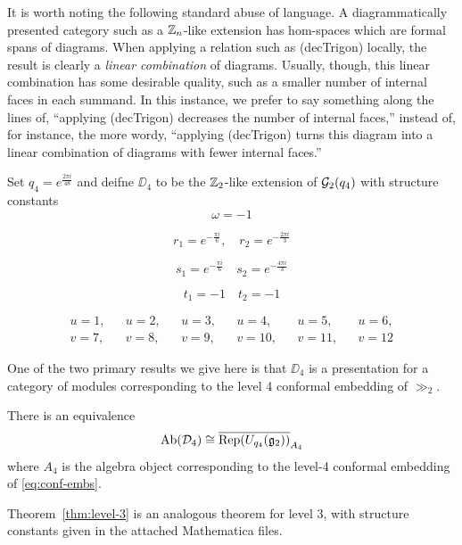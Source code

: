\begin{remark}
    It is worth noting the following standard abuse of language. 
    A diagrammatically presented category such as a $\mathbb{Z}_n$-like extension has hom-spaces which are formal spans of diagrams.
    When applying a relation such as (decTrigon) locally, the result is clearly a {\it linear combination} of diagrams.
    Usually, though, this linear combination has some desirable quality, such as a smaller number of internal faces in each summand.
    In this instance, we prefer to say something along the lines of, 
    ``applying (decTrigon) decreases the number of internal faces,''
    instead of, for instance, the more wordy,
    ``applying (decTrigon) turns this diagram into a linear combination of diagrams with fewer internal faces.''
\end{remark}



\begin{definition}
    Set $q_4 = e^{\frac{2\pi i}{48}}$ and deifne $\DD_4$ to be the $\mathbb{Z}_2$-like extension of $\mathcal{G}_2(q_4)$ with structure constants
    \begin{equation*}
    \omega = -1
    \end{equation*}

    \begin{equation*}
        r_1 = e^{-\frac{\pi i}{6}}, \quad r_2 = e^{-\frac{2\pi i}{3}}
    \end{equation*}

    \begin{equation*}
        s_1 = e^{-\frac{\pi i}{6}} \quad s_2 = e^{-\frac{4\pi i}{3}}
    \end{equation*}

    \begin{equation*}
        t_1 = -1 \quad t_2 = -1
    \end{equation*}

    \begin{align*}
        u = 1, && u = 2, && u = 3, && u = 4, && u = 5, && u = 6, \\
        v = 7, && v = 8, && v = 9, && v = 10, && v = 11, && v = 12 
    \end{align*}


\end{definition}



One of the two primary results we give here is that $\DD_4$ is a presentation for a category of modules corresponding to the
level 4 conformal embedding of $\gg_2$.
\begin{theorem}
    There is an equivalence
    \[
        \operatorname{Ab}(\mathcal{D}_4) \cong \overline{\operatorname{Rep}(U_{q_4}(\mathfrak{g}_2))}_{A_4}
    \]
    where $A_4$ is the algebra object corresponding to the level-4 conformal embedding of \ref{eq:conf-embs}.
\end{theorem}
Theorem~\ref{thm:level-3} is an analogous theorem for level 3, with structure constants given in the attached Mathematica files.



